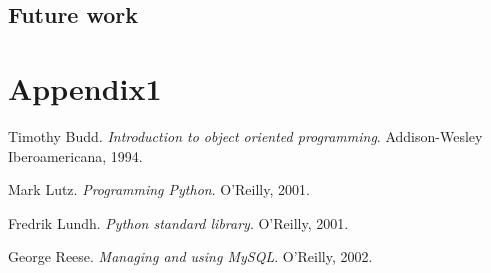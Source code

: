 \documentclass[a4paper, 12pt]{book}
\begin{document}
\section{Future work}
\label{sec:future}



\appendix
\chapter{Appendix1}
\label{app:primer}



\begin{thebibliography}{25}


 Timothy Budd. \textit{Introduction to object oriented 
programming}. Addison-Wesley Iberoamericana, 1994.

 Mark Lutz. \textit{Programming Python}. O'Reilly, 2001.

 Fredrik Lundh. \textit{Python standard library}. O'Reilly,
2001.

 George Reese. \textit{Managing and using MySQL}. O'Reilly,
2002.

\end{thebibliography}
\end{document}
